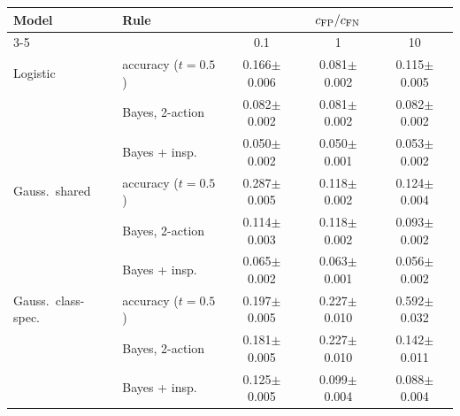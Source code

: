 \begin{tabular}{llccc}
\toprule
Model & Rule & \multicolumn{3}{c}{$c_{\mathrm{FP}}/c_{\mathrm{FN}}$} \\
\cmidrule(l){3-5}
 & & 0.1 & 1 & 10 \\
\midrule
Logistic & accuracy ($t=0.5$) & 0.166{\scriptsize$\pm$0.006} & 0.081{\scriptsize$\pm$0.002} & 0.115{\scriptsize$\pm$0.005} \\
 & Bayes, 2-action & 0.082{\scriptsize$\pm$0.002} & 0.081{\scriptsize$\pm$0.002} & 0.082{\scriptsize$\pm$0.002} \\
 & Bayes + insp. & 0.050{\scriptsize$\pm$0.002} & 0.050{\scriptsize$\pm$0.001} & 0.053{\scriptsize$\pm$0.002} \\
\midrule
Gauss.\ shared & accuracy ($t=0.5$) & 0.287{\scriptsize$\pm$0.005} & 0.118{\scriptsize$\pm$0.002} & 0.124{\scriptsize$\pm$0.004} \\
 & Bayes, 2-action & 0.114{\scriptsize$\pm$0.003} & 0.118{\scriptsize$\pm$0.002} & 0.093{\scriptsize$\pm$0.002} \\
 & Bayes + insp. & 0.065{\scriptsize$\pm$0.002} & 0.063{\scriptsize$\pm$0.001} & 0.056{\scriptsize$\pm$0.002} \\
\midrule
Gauss.\ class-spec. & accuracy ($t=0.5$) & 0.197{\scriptsize$\pm$0.005} & 0.227{\scriptsize$\pm$0.010} & 0.592{\scriptsize$\pm$0.032} \\
 & Bayes, 2-action & 0.181{\scriptsize$\pm$0.005} & 0.227{\scriptsize$\pm$0.010} & 0.142{\scriptsize$\pm$0.011} \\
 & Bayes + insp. & 0.125{\scriptsize$\pm$0.005} & 0.099{\scriptsize$\pm$0.004} & 0.088{\scriptsize$\pm$0.004} \\
\bottomrule
\end{tabular}
